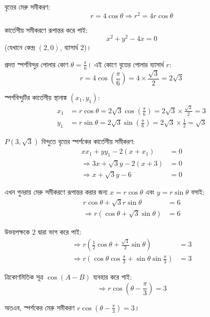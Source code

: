 \documentclass[12pt, a4paper]{article}
\begin{document}
\begin{tcolorbox}[solutionbox={সমাধান (Solution)}]
    \noindent
    বৃত্তের মেরু সমীকরণ:
    \[ r = 4\cos\theta \Rightarrow r^2 = 4r\cos\theta \]
    
    \vspace{0.5em}
    কার্তেসীয় সমীকরণে রূপান্তর করে পাই:
    \[ x^2 + y^2 - 4x = 0 \]
    (যেখানে কেন্দ্র $(2, 0)$, ব্যাসার্ধ $2$)।
    
    \vspace{0.5em}
    প্রদত্ত স্পর্শবিন্দুর পোলার কোণ $\theta = \frac{\pi}{6}$। এই কোণে বৃত্তের পোলার ব্যাসার্ধ $r$:
    \[ r = 4\cos\left(\frac{\pi}{6}\right) = 4 \times \frac{\sqrt{3}}{2} = 2\sqrt{3} \]
    
    \vspace{0.5em}
    স্পর্শবিন্দুটির কার্তেসীয় স্থানাঙ্ক $(x_1, y_1)$:
    \begin{align*}
        x_1 &= r\cos\theta = 2\sqrt{3}\cos\left(\frac{\pi}{6}\right) = 2\sqrt{3} \times \frac{\sqrt{3}}{2} = 3 \\
        y_1 &= r\sin\theta = 2\sqrt{3}\sin\left(\frac{\pi}{6}\right) = 2\sqrt{3} \times \frac{1}{2} = \sqrt{3}
    \end{align*}
    
    \vspace{0.5em}
    $P(3, \sqrt{3})$ বিন্দুতে বৃত্তের স্পর্শকের কার্তেসীয় সমীকরণ:
    \begin{align*}
        xx_1 + yy_1 - 2(x + x_1) &= 0 \\
        \Rightarrow 3x + \sqrt{3}y - 2(x + 3) &= 0 \\
        \Rightarrow x + \sqrt{3}y - 6 &= 0
    \end{align*}
    
    \vspace{0.5em}
    এখন পুনরায় মেরু সমীকরণে রূপান্তর করার জন্য $x = r\cos\theta$ এবং $y = r\sin\theta$ বসাই:
    \begin{align*}
        r\cos\theta + \sqrt{3}r\sin\theta &= 6 \\
        \Rightarrow r(\cos\theta + \sqrt{3}\sin\theta) &= 6
    \end{align*}
    
    \vspace{0.5em}
    উভয়পক্ষকে $2$ দ্বারা ভাগ করে পাই:
    \begin{align*}
        \Rightarrow r\left(\frac{1}{2}\cos\theta + \frac{\sqrt{3}}{2}\sin\theta\right) &= 3 \\
        \Rightarrow r\left(\cos\theta\cos\frac{\pi}{3} + \sin\theta\sin\frac{\pi}{3}\right) &= 3
    \end{align*}
    
    \vspace{0.5em}
    ত্রিকোণমিতিক সূত্র $\cos(A-B)$ ব্যবহার করে পাই:
    \[ \Rightarrow r\cos\left(\theta - \frac{\pi}{3}\right) = 3 \]
    
    \vspace{0.5em}
    অতএব, স্পর্শকের মেরু সমীকরণ $r\cos\left(\theta - \frac{\pi}{3}\right) = 3$।
\end{tcolorbox}
\end{document}
